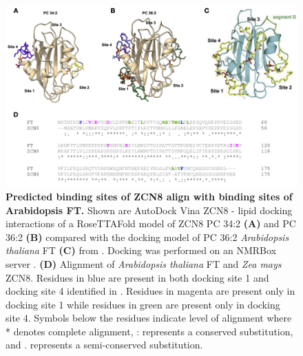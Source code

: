 \begin{figure}[t]
\begin{center}
\includegraphics[width=\linewidth]{Sup_Figures/Sup_Fig_12.png}
\caption[Predicted binding sites of ZCN8 align with binding sites of Arabidopsis FT.]
{\textbf{Predicted binding sites of ZCN8 align with binding sites of Arabidopsis FT.}
Shown are AutoDock Vina \cite{trott2010-su} ZCN8 - lipid docking interactions of a RoseTTAFold \cite{baek2021sci} model of ZCN8 PC 34:2 \textbf{(A)} and PC 36:2 \textbf{(B)} compared with the docking model of PC 36:2 \textit{Arabidopsis thaliana} FT \textbf{(C)} from \cite{nakamura2019-ht}. 
Docking was performed on an NMRBox server \cite{maciejewski2010bj}.
\textbf{(D)} Alignment of \textit{Arabidopsis thaliana} FT and \textit{Zea mays} ZCN8. 
Residues in blue are present in both docking site 1 and docking site 4 identified in \cite{nakamura2019-ht}. 
Residues in magenta are present only in docking site 1 while residues in green are present only in docking site 4. 
Symbols below the residues indicate level of alignment where * denotes complete alignment, : represents a conserved substitution, and . represents a semi-conserved substitution.}
\label{figure:Sup:Docking}
\end{center}
\end{figure} 


